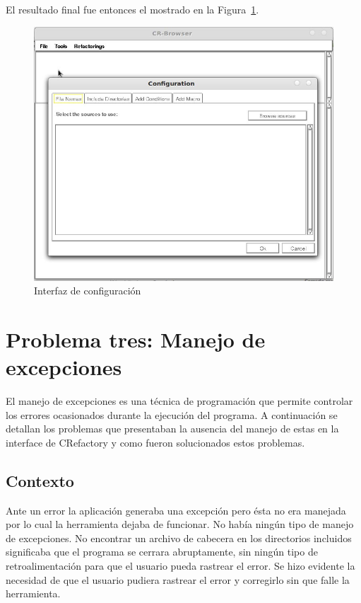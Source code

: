 \documentclass[a4paper,oneside,12pt]{article}
\begin{document}
El resultado final fue entonces el mostrado en la Figura~\ref{configuracion}.

\begin{figure}[h!]
  \centering
    \includegraphics[scale=0.45]{images/codigo_modificado/configuracion.jpg}
     \caption{Interfaz de configuraci\'on}
     \label{configuracion}
\end{figure}

\section{Problema tres: Manejo de excepciones}

El manejo de excepciones es una t\'ecnica de programaci\'on que permite controlar los errores ocasionados durante la ejecuci\'on del programa.
A continuaci\'on se detallan los problemas que presentaban la ausencia del manejo de estas en la interface de CRefactory y como fueron solucionados estos problemas.

\subsection{Contexto}
Ante un error la aplicaci\'on generaba una excepci\'on pero \'esta no era manejada por lo cual la herramienta dejaba de funcionar. No hab\'ia ning\'un tipo de manejo de excepciones. No encontrar un archivo de cabecera en los directorios incluidos significaba que el programa se cerrara abruptamente, sin ning\'un tipo de retroalimentaci\'on para que el usuario pueda rastrear el error. Se hizo evidente la necesidad de que el usuario pudiera rastrear el error y corregirlo sin que falle la herramienta.
\end{document}

